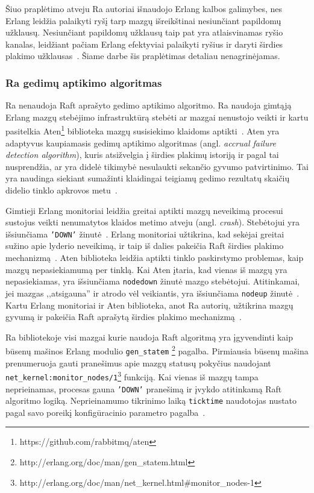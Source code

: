 \documentclass{VUMIFPSkursinis}
\begin{document}
Šiuo praplėtimo atveju Ra autoriai išnaudojo Erlang kalbos galimybes, nes Erlang leidžia palaikyti ryšį tarp mazgų išreikštinai nesiunčiant papildomų užklausų. Nesiunčiant papildomų užklausų taip pat yra atlaisvinamas ryšio kanalas, leidžiant pačiam Erlang efektyviai palaikyti ryšius ir daryti širdies plakimo užklausas~\cite{rabbitmqra}. Šiame darbe šis praplėtimas detaliau nenagrinėjamas.

\subsubsection{Ra gedimų aptikimo algoritmas}

Ra nenaudoja Raft aprašyto gedimo aptikimo algoritmo. Ra naudoja gimtąją Erlang mazgų stebėjimo infrastruktūrą stebėti ar mazgai nenustojo veikti ir kartu pasitelkia Aten\footnote{https://github.com/rabbitmq/aten} biblioteka mazgų susisiekimo klaidoms aptikti~\cite{rabbitmqra}. Aten yra adaptyvus kaupiamasis gedimų aptikimo algoritmas (angl. \textit{accrual failure detection algorithm}), kuris atsižvelgia į širdies plakimų istoriją ir pagal tai nusprendžia, ar yra didelė tikimybė nesulaukti sekančio gyvumo patvirtinimo. Tai yra naudinga siekiant sumažinti klaidingai teigiamų gedimo rezultatų skaičių didelio tinklo apkrovos metu~\cite{satzger2007_new_accrual_failure}.  

Gimtieji Erlang monitoriai leidžia greitai aptikti mazgų neveikimą procesui sustojus veikti nenumatytos klaidos metimo atveju (angl. \textit{crash}). Stebėtojui yra išsiunčiama \texttt{'DOWN'} žinutė~\cite{ericsson_erlang_processes_2016}. Erlang monitoriai užtikrina, kad sekėjai greitai sužino apie lyderio neveikimą, ir taip iš dalies pakeičia Raft širdies plakimo mechanizmą~\cite{rabbitmqra}. Aten biblioteka leidžia aptikti tinklo paskirstymo problemas, kaip mazgų nepasiekiamumą per tinklą. Kai Aten įtaria, kad vienas iš mazgų yra nepasiekiamas, yra išsiunčiama \texttt{nodedown} žinutė mazgo stebėtojui. Atitinkamai, jei mazgas ,,atsigauna'' ir atrodo vėl veikiantis, yra išsiunčiama \texttt{nodeup} žinutė~\cite{rabbitmq_aten_2020}. Kartu Erlang monitoriai ir Aten biblioteka, anot Ra autorių, užtikrina mazgų gyvumą ir pakeičia Raft aprašytą širdies plakimo mechanizmą~\cite{rabbitmqra}. 

Ra bibliotekoje visi mazgai kurie naudoja Raft algoritmą yra įgyvendinti kaip būsenų mašinos Erlang modulio \texttt{gen\_statem} \footnote{http://erlang.org/doc/man/gen\_statem.html} pagalba. 
Pirmiausia būsenų mašina prenumeruoja gauti pranešimus apie mazgų statusų pokyčius naudojant \texttt{net\_kernel:monitor\_nodes/1}\footnote{http://erlang.org/doc/man/net\_kernel.html\#monitor\_nodes-1} funkciją. Kai vienas iš mazgų tampa neprieinamas, procesas gauna \texttt{'DOWN'} pranešimą ir įvykdo atitinkamą Raft algoritmo logiką. Neprieinamumo tikrinimo laiką \texttt{ticktime} naudotojas nustato pagal savo poreikį konfigūracinio parametro pagalba~\cite{rabbitmqra}.
\end{document}
